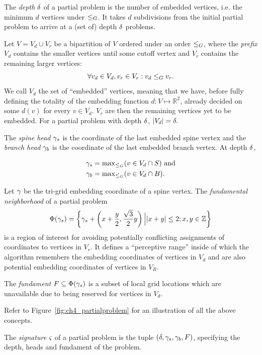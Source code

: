 The \emph{depth} $\delta$ of a partial problem is the number of embedded vertices, i.e. the minimum $d$ vertices under $\leq_G$. It takes $d$ subdivisions from the initial partial problem to arrive at a (set of) depth $\delta$ problems.

Let $V = V_d \cup V_r$ be a bipartition of $V$ ordered under an order $\leq_G$, where the \emph{prefix} $V_d$ contains the smaller vertices until some cutoff vertex and $V_r$ contains the remaining larger vertices: $$\forall v_d \in V_d, v_r \in V_r: v_d \leq_G v_r.$$ We call $V_d$ the set of ``embedded'' vertices, meaning that we have, before fully defining the totality of the embedding function $d: V \mapsto \mathbb R^2$, already decided on some $d(v)$ for every $v \in V_d$. $V_r$ are then the remaining vertices yet to be embedded. For a partial problem with depth $\delta$, $|V_d| = \delta.$

The \emph{spine head} $\gamma_s$ is the coordinate of the last embedded spine vertex and the \emph{branch head} $\gamma_b$ is the coordinate of the last embedded branch vertex. At depth $\delta$, 

\begin{equation*}
\begin{aligned}
\gamma_s &= \mathrm{max}_{\leq_G}(v \in V_d \cap S) \text{ and} \\
\gamma_b &= \mathrm{max}_{\leq_G}(v \in V_d \cap B).
\end{aligned}
\end{equation*}

Let $\gamma$ be the tri-grid embedding coordinate of a spine vertex. The \emph{fundamental neighborhood} of a partial problem $$\Phi(\gamma_s) = \left\{ \gamma_s + \left(x + \frac y2, \frac{\sqrt3}2 y\right) \Big\vert |x + y| \leq 2; x, y \in \mathbb Z \right\}$$ is a region of interest for avoiding potentially conflicting assignments of coordinates to vertices in $V_r$. It defines a ``perceptive range'' inside of which the algorithm remembers the embedding coordinates of vertices in $V_d$ and are also potential embedding coordinates of vertices in $V_R$.

The \emph{fundament} $F \subseteq \Phi(\gamma_s)$ is a subset of local grid locations which are unavailable due to being reserved for vertices in $V_d$.

Refer to Figure~\ref{fig:ch4_partialproblem} for an illustration of all the above concepts.

The \emph{signature} $\varsigma$ of a partial problem is the tuple $(\delta, \gamma_s, \gamma_b, F)$, specifying the depth, heads and fundament of the problem.

